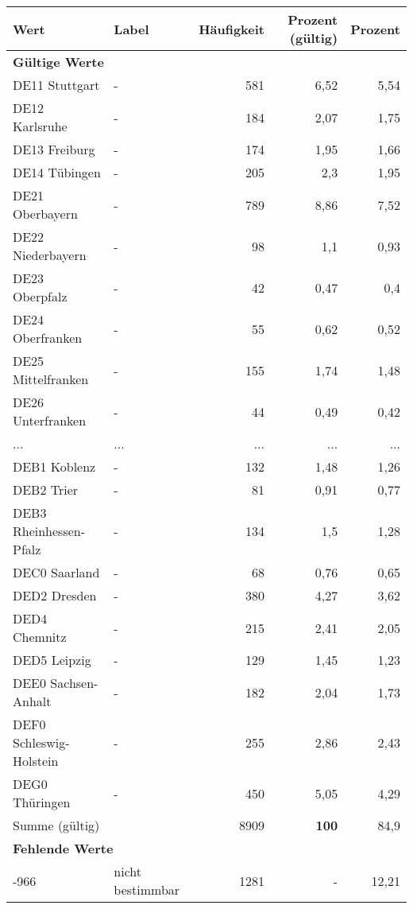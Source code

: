      \begin{longtable}{Xlrrr}
     \toprule
     \textbf{Wert} & \textbf{Label} & \textbf{Häufigkeit} & \textbf{Prozent (gültig)} & \textbf{Prozent} \\
     \endhead
     \midrule
     \multicolumn{5}{l}{\textbf{Gültige Werte}}\\
        \multicolumn{1}{X}{DE11 Stuttgart} & - & 581 & 6,52 & 5,54 \\
        \multicolumn{1}{X}{DE12 Karlsruhe} & - & 184 & 2,07 & 1,75 \\
        \multicolumn{1}{X}{DE13 Freiburg} & - & 174 & 1,95 & 1,66 \\
        \multicolumn{1}{X}{DE14 Tübingen} & - & 205 & 2,3 & 1,95 \\
        \multicolumn{1}{X}{DE21 Oberbayern} & - & 789 & 8,86 & 7,52 \\
        \multicolumn{1}{X}{DE22 Niederbayern} & - & 98 & 1,1 & 0,93 \\
        \multicolumn{1}{X}{DE23 Oberpfalz} & - & 42 & 0,47 & 0,4 \\
        \multicolumn{1}{X}{DE24 Oberfranken} & - & 55 & 0,62 & 0,52 \\
        \multicolumn{1}{X}{DE25 Mittelfranken} & - & 155 & 1,74 & 1,48 \\
        \multicolumn{1}{X}{DE26 Unterfranken} & - & 44 & 0,49 & 0,42 \\
       ... & ... & ... & ... & ... \\
        \multicolumn{1}{X}{DEB1 Koblenz} & - & 132 & 1,48 & 1,26 \\
        \multicolumn{1}{X}{DEB2 Trier} & - & 81 & 0,91 & 0,77 \\
        \multicolumn{1}{X}{DEB3 Rheinhessen-Pfalz} & - & 134 & 1,5 & 1,28 \\
        \multicolumn{1}{X}{DEC0 Saarland} & - & 68 & 0,76 & 0,65 \\
        \multicolumn{1}{X}{DED2 Dresden} & - & 380 & 4,27 & 3,62 \\
        \multicolumn{1}{X}{DED4 Chemnitz} & - & 215 & 2,41 & 2,05 \\
        \multicolumn{1}{X}{DED5 Leipzig} & - & 129 & 1,45 & 1,23 \\
        \multicolumn{1}{X}{DEE0 Sachsen-Anhalt} & - & 182 & 2,04 & 1,73 \\
        \multicolumn{1}{X}{DEF0 Schleswig-Holstein} & - & 255 & 2,86 & 2,43 \\
        \multicolumn{1}{X}{DEG0 Thüringen} & - & 450 & 5,05 & 4,29 \\
     \midrule
      \multicolumn{2}{l}{Summe (gültig)} & 8909 &
      \textbf{100} &
         84,9 \\
     \multicolumn{5}{l}{\textbf{Fehlende Werte}}\\
       -966 & nicht bestimmbar & 1281 & - & 12,21 \\


\end{longtable}
